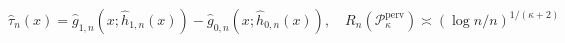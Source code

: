 \(\widehat\tau_n(x)=\widehat g_{1,n}(x;\widehat h_{1,n}(x))-\widehat g_{0,n}(x;\widehat h_{0,n}(x)),\quad R_n(\mathcal P_{\kappa}^{\mathrm{perv}})\asymp(\log n/n)^{1/(\kappa+2)}\)
